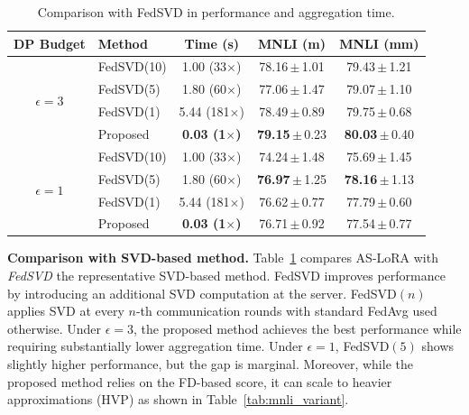\begin{table}
\vspace{-13pt}
\centering
\scriptsize
\setlength{\tabcolsep}{2pt}
\renewcommand{\arraystretch}{1.05}
\newcommand{\std}[1]{\,{\tiny$\pm$}\,\tiny #1}

\caption{Comparison with FedSVD \cite{lee2025fedsvd} in performance and aggregation time.}
\label{tab:analysis_svd}

\begin{tabular}{c l c c c}
\toprule
\textbf{DP Budget} & \textbf{Method} & \textbf{Time (s)} & \textbf{MNLI (m)} & \textbf{MNLI (mm)} \\
\midrule

\multirow{4}{*}{$\epsilon = 3$}
& FedSVD(10) & 1.00 (33$\times$) & 78.16\std{1.01} & 79.43\std{1.21} \\
& FedSVD(5)  & 1.80 (60$\times$) & 77.06\std{1.47} & 79.07\std{1.10} \\
& FedSVD(1)  & 5.44 (181$\times$) & 78.49\std{0.89} & 79.75\std{0.68} \\
& Proposed   & \textbf{0.03 (1$\times$)} & \textbf{79.15}\std{0.23} & \textbf{80.03}\std{0.40} \\
\midrule

\multirow{4}{*}{$\epsilon = 1$}
& FedSVD(10) & 1.00 (33$\times$) & 74.24\std{1.48} & 75.69\std{1.45} \\
& FedSVD(5)  & 1.80 (60$\times$) & \textbf{76.97}\std{1.25} & \textbf{78.16}\std{1.13} \\
& FedSVD(1)  & 5.44 (181$\times$) & 76.62\std{0.77} & 77.79\std{0.60} \\
& Proposed   & \textbf{0.03 (1$\times$)} & 76.71\std{0.92} & 77.54\std{0.77} \\
\bottomrule
\end{tabular}

\vspace{-10pt}
\end{table}

\textbf{Comparison with SVD-based method.} 
Table~\ref{tab:analysis_svd} compares AS-LoRA with \emph{FedSVD} \cite{lee2025fedsvd} the representative SVD-based method. FedSVD improves performance by introducing an additional SVD computation at the server. FedSVD$(n)$ applies SVD at every $n$-th communication rounds with standard FedAvg used otherwise.
Under $\epsilon=3$, the proposed method achieves the best performance while requiring substantially lower aggregation time. Under $\epsilon=1$, FedSVD$(5)$ shows slightly higher performance, but the gap is marginal. 
Moreover, while the proposed method relies on the FD-based score, it can scale to heavier approximations (HVP) as shown in Table~\ref{tab:mnli_variant}.





